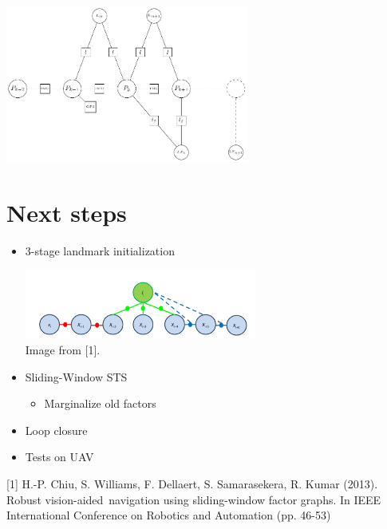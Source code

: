 \documentclass[%
    fourtothree=true, %
    DepLogo=true     %
    ]{ETHpres}
\begin{document}
\begin{center}
\includegraphics[width=0.6\textwidth]{TikZ_drawings/factor_graph_small/factor_graph.pdf}\\
\end{center}

\clearpage

\ETHslide
\section*{Next steps}
\begin{itemize}
	\item[\ETHitem] 3-stage landmark initialization
	\begin{center}
	\includegraphics[width=0.6\textwidth]{pictures/3stageLandmark.png}\\
	\tiny{Image from [1].}
	\end{center}
 	\item[\ETHitem] Sliding-Window STS
	\begin{itemize}
		\item Marginalize old factors	
	\end{itemize} 
	\item[\ETHitem] Loop closure	
	\item[\ETHitem] Tests on UAV
\end{itemize}

\vspace*{1\baselineskip}

\tiny{[1] H.-P. Chiu, S. Williams, F. Dellaert, S. Samarasekera, R. Kumar (2013). Robust vision-aided\ navigation using sliding-window factor graphs. In IEEE International Conference on Robotics and Automation (pp. 46-53)}
\clearpage

\end{document}
